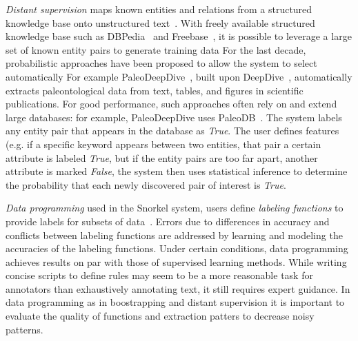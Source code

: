 \textit{Distant supervision} maps known entities and relations from a structured knowledge 
base onto unstructured text~\cite{peters2014machine,zhang2013geodeepdive}. 
With freely available structured knowledge base such as DBPedia~\cite{auer2007dbpedia} and Freebase~\cite{bollacker2008freebase}, it is possible to leverage a large set of known entity pairs to generate training data
For the last decade, probabilistic approaches have been proposed to allow the system to select automatically
For example PaleoDeepDive~\cite{peters2014machine}, built upon DeepDive~\cite{zhang2015deepdive}, automatically extracts
paleontological data from text, tables, and figures in scientific publications. 
For good performance, such approaches often rely on and extend large databases: for example,
PaleoDeepDive uses PaleoDB~\cite{PaleoDB}. 
The system labels any entity pair that appears in the database as \textit{True}.
The user defines features (e.g. if a specific keyword appears between two entities, that pair a certain attribute is labeled \textit{True}, but if the entity pairs are too far apart, another attribute is marked \textit{False}, 
the system then uses statistical inference to determine the probability that each newly discovered pair of interest is \textit{True}.

\textit{Data programming} used in the Snorkel system, users define 
\textit{labeling functions} to provide labels for subsets of data~\cite{ratner2016data}. 
Errors due to differences in accuracy and conflicts between labeling functions are 
addressed by learning and modeling the accuracies of the labeling functions. 
Under certain conditions, data programming achieves results on par with those of supervised learning methods.
While writing concise scripts to define rules may seem to be a more reasonable task for annotators 
than exhaustively annotating text, it still requires expert guidance.  
In data programming as in boostrapping and distant supervision it is important to evaluate the quality of functions and extraction patters to decrease noisy patterns.

